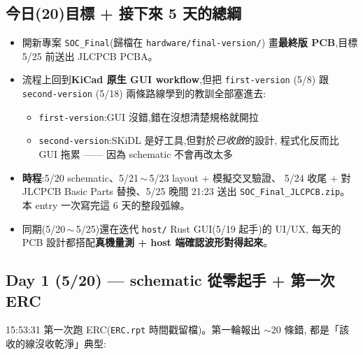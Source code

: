 
\subsection*{今日(20)目標 + 接下來 5 天的總綱}

\begin{itemize}[leftmargin=2em,itemsep=0pt]
  \item 開新專案 \texttt{SOC\_Final}(歸檔在 \texttt{hardware/final-version/})
        畫\textbf{最終版 PCB},目標 5/25 前送出 JLCPCB PCBA。
  \item 流程上回到\textbf{KiCad 原生 GUI workflow},但把 \texttt{first-version} (5/8)
        跟 \texttt{second-version} (5/18) 兩條路線學到的教訓全部塞進去:
        \begin{itemize}[leftmargin=2em,itemsep=0pt]
          \item \texttt{first-version}:GUI 沒錯,錯在沒想清楚規格就開拉
          \item \texttt{second-version}:SKiDL 是好工具,但對於\emph{已收斂}的設計,
                程式化反而比 GUI 拖累 —— 因為 schematic 不會再改太多
        \end{itemize}
  \item \textbf{時程}:5/20 schematic、5/21\,\(\sim\)\,5/23 layout + 模擬交叉驗證、
        5/24 收尾 + 對 JLCPCB Basic Parts 替換、5/25 晚間 21:23 送出 \texttt{SOC\_Final\_JLCPCB.zip}。
        本 entry 一次寫完這 6 天的整段弧線。
  \item 同期(5/20\,\(\sim\)\,5/25)還在迭代 \texttt{host/} Rust GUI(5/19 起手)的 UI/UX,
        每天的 PCB 設計都搭配\textbf{真機量測 + host 端確認波形對得起來}。
\end{itemize}

\subsection*{Day 1 (5/20) — schematic 從零起手 + 第一次 ERC}

15:53:31 第一次跑 ERC(\texttt{ERC.rpt} 時間戳留檔)。第一輪報出 \(\sim 20\) 條錯,
都是「該收的線沒收乾淨」典型:

